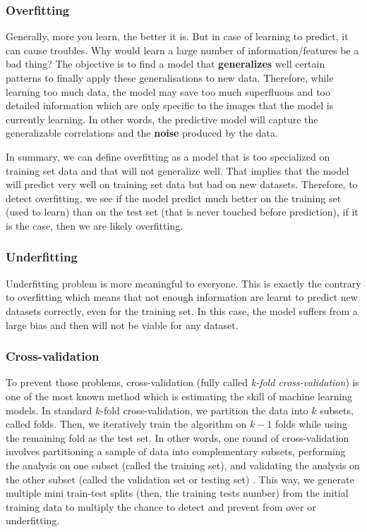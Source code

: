 \documentclass[11pt, openany]{report}
\theoremstyle{plain}
\theoremstyle{definition}
\theoremstyle{remark}
\begin{document}
\subsubsection{Overfitting}
Generally, more you learn, the better it is. But in case of learning to predict, it can cause troubles. Why would learn a large number of information/features be a bad thing? 
The objective is to find a model that \textbf{generalizes} well certain patterns to finally apply these generalisations to new data. Therefore, while learning too much data, the model may save too much superfluous and too detailed information which are only specific to the images that the model is currently learning. In other words, the predictive model will capture the generalizable correlations and the \textbf{noise} produced by the data.

In summary, we can define overfitting as a model that is too specialized on training set data and that will not generalize well. That implies that the model will predict very well on training set data but bad on new datasets. Therefore, to detect overfitting, we see if the model predict much better on the training set (used to learn) than on the test set (that is never touched before prediction), if it is the case, then we are likely overfitting.


\subsubsection{Underfitting}
Underfitting problem is more meaningful to everyone. This is exactly the contrary to overfitting which means that not enough information are learnt to predict new datasets correctly, even for the training set. In this case, the model suffers from a large bias and then will not be viable for any dataset. 


\subsubsection{Cross-validation}
To prevent those problems, cross-validation (fully called \textit{k-fold cross-validation}) is one of the most known method which is estimating the skill of machine learning models. In standard $k$-fold cross-validation, we partition the data into $k$ subsets, called folds. Then, we iteratively train the algorithm on $k-1$ folds while using the remaining fold as the test set. In other words, one round of cross-validation involves partitioning a sample of data into complementary subsets, performing the analysis on one subset (called the training set), and validating the analysis on the other subset (called the validation set or testing set) \cite{wiki-cross-validation}. This way, we generate multiple mini train-test splits (then, the training tests number) from the initial training data to multiply the chance to detect and prevent from over or underfitting.
\end{document}
